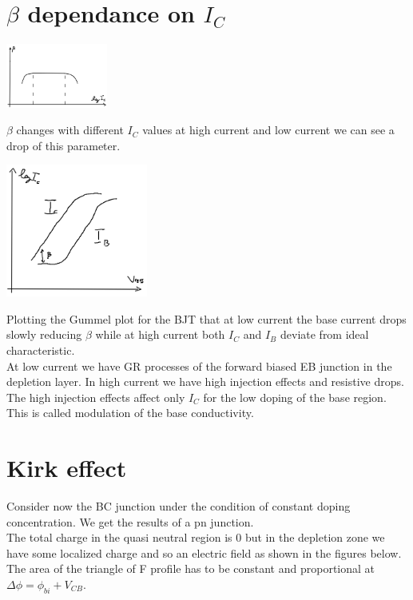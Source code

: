 \section{$\beta$ dependance on $I_C$}

\centering
\includegraphics[width=0.25\textwidth]{bjt7.png}\\
\raggedright

$\beta$ changes with different $I_C$ values at high current and low current we can see a drop of this parameter.

\centering
\includegraphics[width=0.35\textwidth]{bjt8.png}\\
\raggedright

Plotting the Gummel plot for the BJT that at low current the base current drops slowly reducing $\beta$ while at high current both $I_C$ and $I_B$ deviate from ideal characteristic.\\
\vspace{3mm}
At low current we have GR processes of the forward biased EB junction in the depletion layer.
\vspace{3mm}
In high current we have high injection effects and resistive drops. The high injection effects affect only $I_C$ for the low doping of the base region. This is called modulation of the base conductivity.\\

\section{Kirk effect}
Consider now the BC junction under the condition of constant doping concentration. We get the results of a pn junction.\\
The total charge in the quasi neutral region is 0 but in the depletion zone we have some localized charge and so an electric field as shown in the figures below.\\
The area of the triangle of F profile has to be constant and proportional at $\Delta \phi=\phi_{bi}+V_{CB}$.\\

